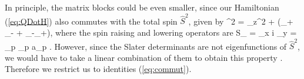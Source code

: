 In principle, the matrix blocks could be even smaller, since our
 Hamiltonian (\ref{eq:QDotH}) also commutes with the total spin $\hat{S}^2$, given by
\be 
 ^2 = _z^2 + (_+ _{-} + _{-}_+),
\ee
where the spin raising and lowering operators are
\be 
S_{\pm} = _x \pm i _y = \sum_p \ad_{p\pm} a_{p \mp}. 
\ee
However, since the Slater determinants are not eigenfunctions of $\hat{S}^2$,  we would have to take a linear combination of them to obtain this property \cite{rontani:124102}. Therefore we restrict us to identities (\ref{eq:commut}).


